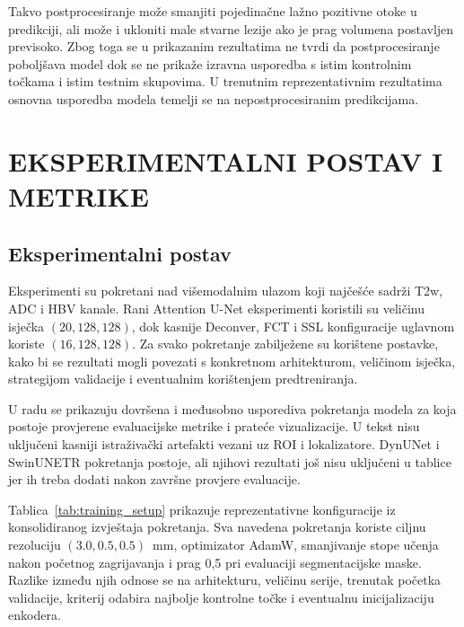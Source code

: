 \documentclass[a4paper,12pt,oneside]{article}
\let\sectionwithoutpagebreak\section
\renewcommand{\section}{\clearpage\sectionwithoutpagebreak}%
\begin{document}
Takvo postprocesiranje može smanjiti pojedinačne lažno pozitivne otoke u predikciji, ali može i ukloniti male stvarne lezije ako je prag volumena postavljen previsoko. Zbog toga se u prikazanim rezultatima ne tvrdi da postprocesiranje poboljšava model dok se ne prikaže izravna usporedba s istim kontrolnim točkama i istim testnim skupovima. U trenutnim reprezentativnim rezultatima osnovna usporedba modela temelji se na nepostprocesiranim predikcijama.


\section{EKSPERIMENTALNI POSTAV I METRIKE}

\subsection{Eksperimentalni postav}

Eksperimenti su pokretani nad višemodalnim ulazom koji najčešće sadrži T2w, ADC i HBV kanale. Rani Attention U-Net eksperimenti koristili su veličinu isječka $(20, 128, 128)$, dok kasnije Deconver, FCT i SSL konfiguracije uglavnom koriste $(16, 128, 128)$. Za svako pokretanje zabilježene su korištene postavke, kako bi se rezultati mogli povezati s konkretnom arhitekturom, veličinom isječka, strategijom validacije i eventualnim korištenjem predtreniranja.

U radu se prikazuju dovršena i međusobno usporediva pokretanja modela za koja postoje provjerene evaluacijske metrike i prateće vizualizacije. U tekst nisu uključeni kasniji istraživački artefakti vezani uz ROI i lokalizatore. DynUNet i SwinUNETR pokretanja postoje, ali njihovi rezultati još nisu uključeni u tablice jer ih treba dodati nakon završne provjere evaluacije.


Tablica~\ref{tab:training_setup} prikazuje reprezentativne konfiguracije iz konsolidiranog izvještaja pokretanja. Sva navedena pokretanja koriste ciljnu rezoluciju $(3.0, 0.5, 0.5)$~mm, optimizator AdamW, smanjivanje stope učenja nakon početnog zagrijavanja i prag 0,5 pri evaluaciji segmentacijske maske. Razlike između njih odnose se na arhitekturu, veličinu serije, trenutak početka validacije, kriterij odabira najbolje kontrolne točke i eventualnu inicijalizaciju enkodera.
\end{document}
